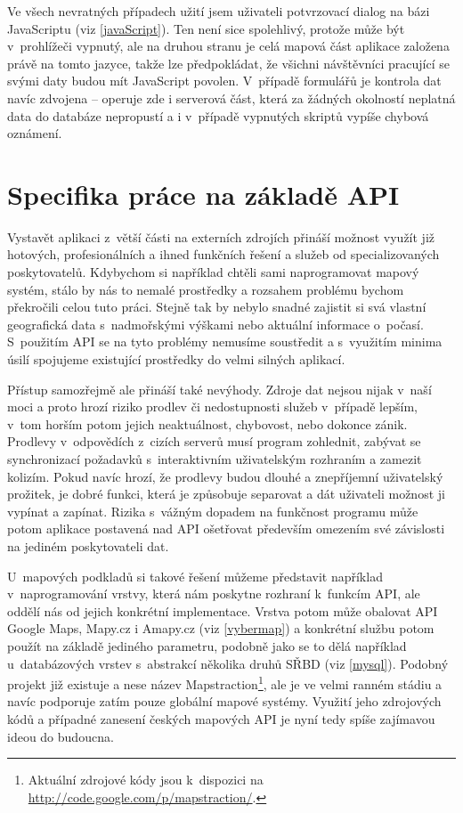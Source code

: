 Ve všech nevratných případech užití jsem uživateli 
potvrzovací dialog na bázi JavaScriptu (viz \ref{javaScript}). Ten
není sice spolehlivý, protože může být v~prohlížeči vypnutý, ale na
druhou stranu je celá mapová část aplikace založena právě na tomto jazyce,
takže lze předpokládat, že všichni návštěvníci pracující se svými
daty budou mít JavaScript povolen. V~případě formulářů je kontrola dat
navíc zdvojena -- operuje zde i serverová část, která za žádných
okolností neplatná data do databáze nepropustí a i v~případě
vypnutých skriptů vypíše chybová oznámení.

\section{Specifika práce na základě API}
Vystavět aplikaci z~větší části na externích zdrojích přináší možnost
využít již hotových, profesionálních a ihned funkčních řešení a služeb
od specializovaných poskytovatelů. Kdybychom si například chtěli sami
naprogramovat mapový systém, stálo by nás to nemalé prostředky a
rozsahem problému bychom překročili celou tuto práci. Stejně tak by
nebylo snadné zajistit si svá vlastní geografická data s~nadmořskými
výškami nebo aktuální informace o~počasí. S~použitím API se na tyto
problémy nemusíme soustředit a s~využitím minima úsilí spojujeme
existující prostředky do velmi silných aplikací.

Přístup samozřejmě ale přináší také nevýhody. Zdroje dat nejsou nijak
v~naší moci a proto hrozí riziko prodlev či nedostupnosti služeb
v~případě lepším, v~tom horším potom jejich neaktuálnost, chybovost, nebo
dokonce zánik. Prodlevy v~odpovědích z~cizích serverů musí program
zohlednit, zabývat se synchronizací požadavků s~interaktivním
uživatelským rozhraním a zamezit kolizím. Pokud navíc hrozí, že 
prodlevy budou dlouhé a znepříjemní uživatelský prožitek, je dobré
funkci, která je způsobuje separovat a dát uživateli možnost ji
vypínat a zapínat. Rizika s~vážným dopadem na funkčnost programu může
potom aplikace postavená nad API ošetřovat především omezením své
závislosti na jediném poskytovateli dat.

U~mapových podkladů si takové řešení můžeme představit například
v~naprogramování vrstvy, která nám poskytne rozhraní k~funkcím API,
ale oddělí nás od jejich konkrétní implementace. Vrstva potom může
obalovat API Google Maps, Mapy.cz i Amapy.cz (viz \ref{vybermap}) a
konkrétní službu potom použít na základě jediného parametru, podobně
jako se to dělá například u~databázových vrstev s~abstrakcí
několika druhů SŘBD (viz \ref{mysql}). Podobný projekt již existuje a
nese název Mapstraction\footnote{Aktuální zdrojové kódy jsou k~dispozici na
\url{http://code.google.com/p/mapstraction/}.}, ale je ve velmi ranném stádiu
a navíc podporuje zatím pouze globální
mapové systémy. Využití jeho zdrojových kódů a případné zanesení českých
mapových API je nyní tedy spíše zajímavou ideou do budoucna.

